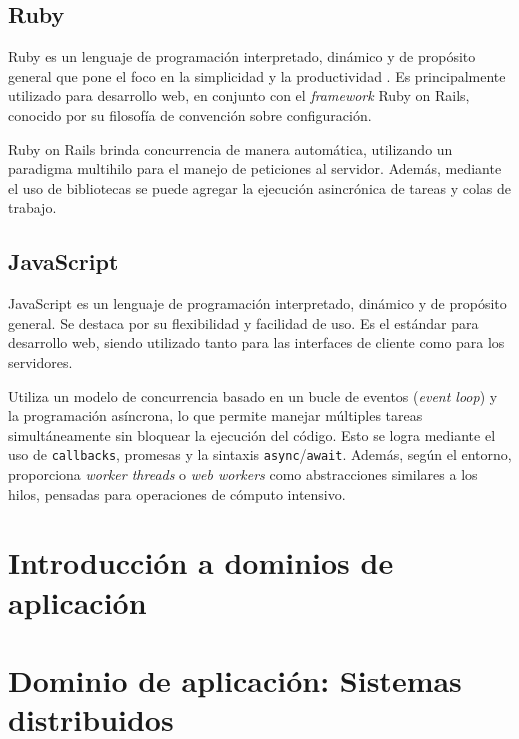 \documentclass[11pt]{article}
\let\Oldsection\section
\renewcommand{\section}{\FloatBarrier\Oldsection}
\let\Oldsubsection\subsection
\renewcommand{\subsection}{\FloatBarrier\Oldsubsection}
\newcommand{\english}[1]{\textit{#1}}
\begin{document}
\subsection{Ruby}

Ruby es un lenguaje de programación interpretado, dinámico y de propósito general que pone el foco en la simplicidad y la productividad \cite{com:ruby}. Es principalmente utilizado para desarrollo web, en conjunto con el \english{framework} Ruby on Rails, conocido por su filosofía de convención sobre configuración.

Ruby on Rails brinda concurrencia de manera automática, utilizando un paradigma multihilo para el manejo de peticiones al servidor. Además, mediante el uso de bibliotecas se puede agregar la ejecución asincrónica de tareas y colas de trabajo.

\subsection{JavaScript}

JavaScript es un lenguaje de programación interpretado, dinámico y de propósito general. Se destaca por su flexibilidad y facilidad de uso. Es el estándar para desarrollo web, siendo utilizado tanto para las interfaces de cliente como para los servidores.

Utiliza un modelo de concurrencia basado en un bucle de eventos (\english{event loop}) y la programación asíncrona, lo que permite manejar múltiples tareas simultáneamente sin bloquear la ejecución del código. Esto se logra mediante el uso de \lstinline{callbacks}, promesas y la sintaxis \lstinline{async}/\lstinline{await}. Además, según el entorno, proporciona \english{worker threads} o \english{web workers} como abstracciones similares a los hilos, pensadas para operaciones de cómputo intensivo.

\newpage %

\section{Introducción a dominios de aplicación}


\section{Dominio de aplicación: Sistemas distribuidos}\label{sec:sis_dist}
\end{document}
